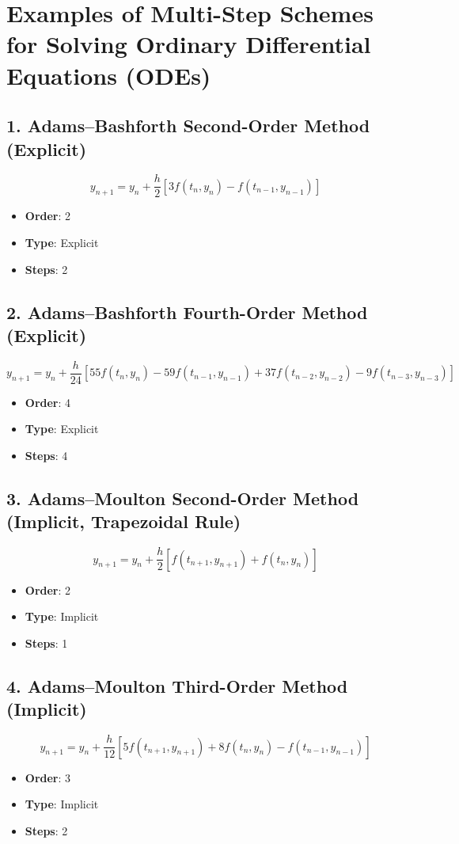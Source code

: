 \documentclass{article}
\begin{document}
\section*{Examples of Multi-Step Schemes for Solving Ordinary Differential Equations (ODEs)}

\subsection*{1. Adams–Bashforth Second-Order Method (Explicit)}
\[
y_{n+1} = y_n + \frac{h}{2} \left[ 3f(t_n, y_n) - f(t_{n-1}, y_{n-1}) \right]
\]
\begin{itemize}
    \item \textbf{Order}: 2
    \item \textbf{Type}: Explicit
    \item \textbf{Steps}: 2
\end{itemize}

\subsection*{2. Adams–Bashforth Fourth-Order Method (Explicit)}
\[
y_{n+1} = y_n + \frac{h}{24} \left[ 55f(t_n, y_n) - 59f(t_{n-1}, y_{n-1}) + 37f(t_{n-2}, y_{n-2}) - 9f(t_{n-3}, y_{n-3}) \right]
\]
\begin{itemize}
    \item \textbf{Order}: 4
    \item \textbf{Type}: Explicit
    \item \textbf{Steps}: 4
\end{itemize}

\subsection*{3. Adams–Moulton Second-Order Method (Implicit, Trapezoidal Rule)}
\[
y_{n+1} = y_n + \frac{h}{2} \left[ f(t_{n+1}, y_{n+1}) + f(t_n, y_n) \right]
\]
\begin{itemize}
    \item \textbf{Order}: 2
    \item \textbf{Type}: Implicit
    \item \textbf{Steps}: 1
\end{itemize}

\subsection*{4. Adams–Moulton Third-Order Method (Implicit)}
\[
y_{n+1} = y_n + \frac{h}{12} \left[ 5f(t_{n+1}, y_{n+1}) + 8f(t_n, y_n) - f(t_{n-1}, y_{n-1}) \right]
\]
\begin{itemize}
    \item \textbf{Order}: 3
    \item \textbf{Type}: Implicit
    \item \textbf{Steps}: 2
\end{itemize}
\end{document}

